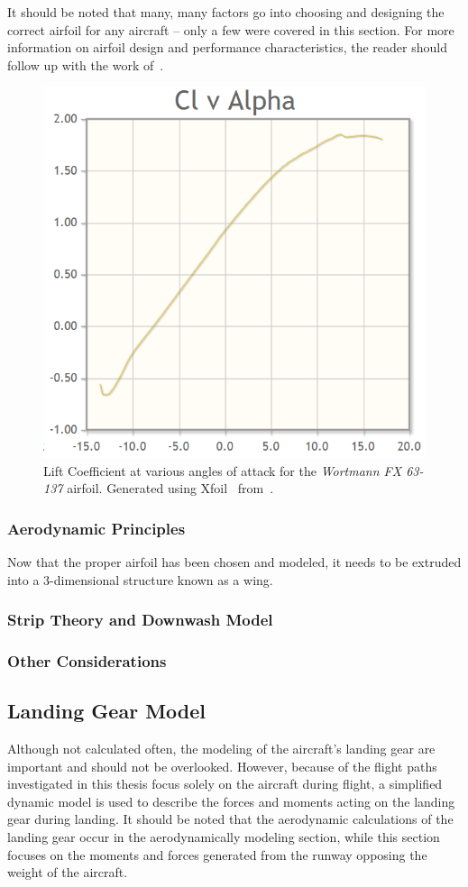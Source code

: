 \documentclass[12pt]{report}
\begin{document}
It should be noted that many, many factors go into choosing and designing the correct airfoil for any aircraft {--} only a few were covered in this section. For more information on airfoil design and performance characteristics, the reader should follow up with the work of~\cite{972HowAirfoil,AerodynamicsforengineersJohnBertin}.

\begin{figure}[!ht]\label{fig:xfoil}
  \centering
  \includegraphics[width=0.5\linewidth]{Figures/liftvsalpha.png}
  \caption{Lift Coefficient at various angles of attack for the \textit{Wortmann FX 63{-}137} airfoil. Generated using Xfoil~\cite{zotero-6685} from~\cite{WORTMANNFX63137}.}
\end{figure}

\subsubsection{Aerodynamic Principles}

Now that the proper airfoil has been chosen and modeled, it needs to be extruded into a 3-dimensional structure known as a wing.

\subsubsection{Strip Theory and Downwash Model}

\subsubsection{Other Considerations}




\subsection{Landing Gear Model}
Although not calculated often, the modeling of the aircraft's landing gear are important and should not be overlooked. However, because of the flight paths investigated in this thesis focus solely on the aircraft during flight, a simplified dynamic model is used to describe the forces and moments acting on the landing gear during landing. It should be noted that the aerodynamic calculations of the landing gear occur in the aerodynamically modeling section, while this section focuses on the moments and forces generated from the runway opposing the weight of the aircraft.
\end{document}
